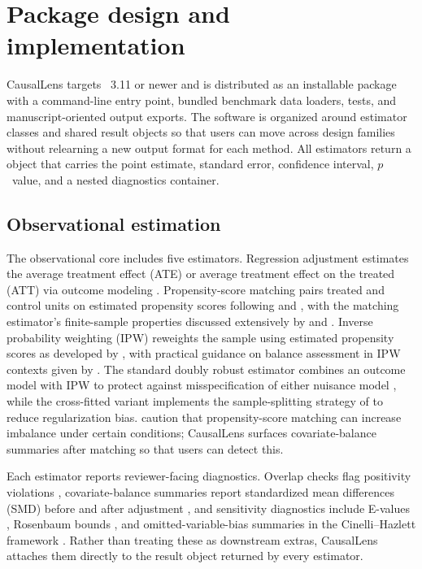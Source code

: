 \documentclass[article]{jss}
\begin{document}

\section{Package design and implementation}\label{sec:implementation}

CausalLens targets ~3.11 or newer and is distributed as an
installable package with a command-line entry point, bundled benchmark data
loaders, tests, and manuscript-oriented output exports. The software is
organized around estimator classes and shared result objects so that users can
move across design families without relearning a new output format for each
method. All estimators return a  object that carries the
point estimate, standard error, confidence interval, $p$~value, and a nested
diagnostics container.

\subsection{Observational estimation}\label{sec:obs}

The observational core includes five estimators. Regression adjustment
estimates the average treatment effect (ATE) or average treatment effect on
the treated (ATT) via outcome modeling
\citep{Wooldridge2010}. Propensity-score matching pairs treated and control
units on estimated propensity scores following
\citet{RosenbaumRubin1983} and \citet{AbadieImbens2006}, with the matching
estimator's finite-sample properties discussed extensively by
\citet{HeckmanIchimuraTodd1997} and \citet{SmithTodd2005}.
Inverse probability weighting (IPW) reweights the sample using estimated
propensity scores as developed by \citet{HiranoImbensRidder2003}, with
practical guidance on balance assessment in IPW contexts given by
\citet{AustinStuart2015}. The standard doubly robust estimator combines an
outcome model with IPW to protect against misspecification of either
nuisance model
\citep{RobinsRotnitzkyZhao1994,BangRobins2005,FunkEtAl2011},
while the cross-fitted variant implements the sample-splitting strategy
of \citet{ChernozhukovEtAl2018} to reduce regularization bias.
\citet{KingNielsen2019} caution that propensity-score matching can increase
imbalance under certain conditions; CausalLens surfaces covariate-balance
summaries after matching so that users can detect this.

Each estimator reports reviewer-facing diagnostics. Overlap checks flag
positivity violations \citep{Stuart2010}, covariate-balance summaries report
standardized mean differences (SMD) before and after
adjustment \citep{Austin2009,AustinStuart2015}, and sensitivity
diagnostics include E-values \citep{VanderWeeleDing2017}, Rosenbaum
bounds \citep{Rosenbaum2002}, and omitted-variable-bias summaries in the
Cinelli--Hazlett framework \citep{CinelliHazlett2020}. Rather than treating
these as downstream extras, CausalLens attaches them directly to the result
object returned by every estimator.
\end{document}
